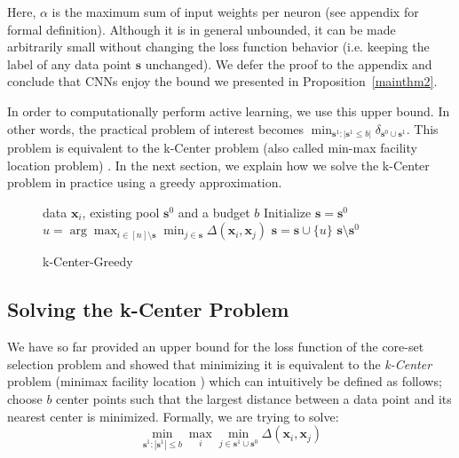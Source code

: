 \documentclass{article} %
\makeatletter
\newcommand*{\ie}{i.e.\@\xspace}
\makeatother
\begin{document}
Here, $\alpha$ is the maximum sum of  input weights per neuron (see appendix for formal definition). Although it is in
general unbounded, it can be made arbitrarily small without changing the loss function behavior (\ie keeping the label
of any data point $\mathbf{s}$ unchanged). We defer the proof to the appendix and conclude that CNNs enjoy the bound we
presented in Proposition~\ref{mainthm2}.

In order to computationally perform active learning, we use this upper bound. In other words, the practical problem of interest becomes $\min_{\mathbf{s}^1:|\mathbf{s}^1 \leq b|} \delta_{\mathbf{s}^0\cup \mathbf{s}^1}$. This problem is equivalent to the k-Center problem (also called min-max facility location problem) \citep{facility}. In the next section, we explain how we solve the k-Center problem in practice using a greedy approximation.{\par}

\begin{figure}
\begin{minipage}{0.44\textwidth}
\vspace{-8mm}
   \begin{algorithm}[H] 
   \caption{k-Center-Greedy} 
   \label{alg:greedy} 
   \begin{algorithmic} 
    data $\mathbf{x}_i$, existing pool $\mathbf{s}^0$ and a budget $b$ 
   \STATE Initialize $\mathbf{s}=\mathbf{s}^0$ \REPEAT \STATE $u=\arg\max_{i \in [n] \setminus \mathbf{s}} \min_{j \in \mathbf{s}} \Delta(\mathbf{x}_i, \mathbf{x}_j)$ \STATE $\mathbf{s} = \mathbf{s} \cup \{u\}$ 
    $\mathbf{s} \setminus \mathbf{s}^0$ \end{algorithmic}
\end{algorithm} 
\vspace{-10mm}
\end{minipage} 
\end{figure}  

\subsection{Solving the k-Center Problem} 
\label{sec:alg} 
We have so far provided an upper bound for the loss function of the core-set selection problem and showed that minimizing it is equivalent to the \emph{k-Center} problem (minimax facility location \citep{facility}) which can intuitively be defined as follows; choose $b$ center points such that the  largest distance between a data point and its nearest center is minimized. Formally, we are trying to solve: 
\begin{equation}
    \min_{\mathbf{s}^1:|\mathbf{s}^1| \leq b} \max_i \min_{j \in \mathbf{s}^1 \cup \mathbf{s}^0} \Delta(\mathbf{x}_i,\mathbf{x}_j)
\end{equation}
\end{document}
